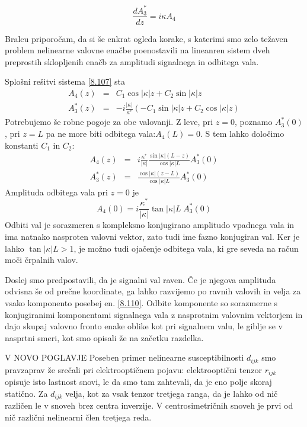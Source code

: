 \begin{equation}
\frac{dA_{3}^{*}}{dz}=i\kappa A_{4}\label{8.107}
\end{equation}


Bralcu priporočam, da si še enkrat ogleda korake, s katerimi smo zelo
težaven problem nelinearne valovne enačbe poenostavili na lineanren
sistem dveh preprostih sklopljenih enačb za amplitudi signalnega in
odbitega vala.

Splošni rešitvi sistema \ref{8.107} sta 
\begin{eqnarray}
A_{4}\left(z\right) & = & C_{1}\cos\left|\kappa\right|z+C_{2}\sin\left|\kappa\right|z\label{8.108}\\
A_{3}^{*}\left(z\right) & = & -i\frac{\left|\kappa\right|}{\kappa^{*}}\left(-C_{1}\sin\left|\kappa\right|z+C_{2}\cos\left|\kappa\right|z\right)\nonumber 
\end{eqnarray}
 Potrebujemo še robne pogoje za obe valovanji. Z leve, pri $z=0$,
poznamo $A_{3}^{*}\left(0\right)$, pri $z=L$ pa ne more biti odbitega
vala:$A_{4}\left(L\right)=0$. S tem lahko določimo konstanti $C_{1}$
in $C_{2}$: 
\begin{eqnarray}
A_{4}\left(z\right) & = & i\frac{\kappa^{*}}{\left|\kappa\right|}\frac{\sin\left|\kappa\right|\left(L-z\right)}{\cos\left|\kappa\right|L}A_{3}^{*}\left(0\right)\label{8.109}\\
A_{3}^{*}\left(z\right) & = & \frac{\cos\left|\kappa\right|\left(z-L\right)}{\cos\left|\kappa\right|L}A_{3}^{*}\left(0\right)\nonumber 
\end{eqnarray}
 Amplituda odbitega vala pri $z=0$ je 
\begin{equation}
A_{4}\left(0\right)=i\frac{\kappa^{*}}{\left|\kappa\right|}\tan\left|\kappa\right|L\; A_{3}^{*}\left(0\right)\label{8.110}
\end{equation}
 Odbiti val je sorazmeren s kompleksno konjugirano amplitudo vpadnega
vala in ima natnako nasproten valovni vektor, zato tudi ime fazno
konjugiran val. Ker je lahko $\tan\left|\kappa\right|L>1$, je možno
tudi ojačenje odbitega vala, ki gre seveda na račun moči črpalnih
valov.

Doslej smo predpostavili, da je signalni val raven. Če je njegova
amplituda odvisna še od prečne koordinate, ga lahko razvijemo po ravnih
valovih in velja za vsako komponento posebej en. \ref{8.110}. Odbite
komponente so sorazmerne s konjugiranimi komponentami signalnega vala
z nasprotnim valovnim vektorjem in dajo skupaj valovno fronto enake
oblike kot pri signalnem valu, le giblje se v nasprtni smeri, kot
smo opisali že na začetku razdelka.

V NOVO POGLAVJE
Poseben primer nelinearne susceptibilnosti $d_{ijk}$ smo pravzaprav
že srečali pri elektrooptičnem pojavu: elektrooptični tenzor $r_{ijk}$
opisuje isto lastnost snovi, le da smo tam zahtevali, da je eno polje
skoraj statično. Za $d_{ijk}$ velja, kot za vsak tenzor tretjega
ranga, da je lahko od nič različen le v snoveh brez centra inverzije.
V centrosimetričnih snoveh je prvi od nič različni nelinearni člen
tretjega reda.